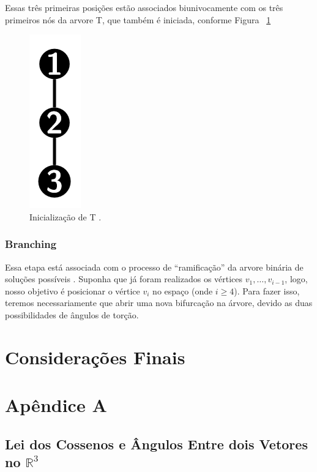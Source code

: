 \documentclass[a4paper,12pt]{article}
\begin{document}
	Essas três primeiras posições estão associados biunivocamente com os três primeiros nós da arvore T, que também é iniciada, conforme Figura ~\ref{fig:bp1}
	
	\begin{figure}[H]
		\begin{center}
			\includegraphics[width=0.035\linewidth]{bp1.png}
		\end{center}
		\caption{Inicialização de T \cite{fidalgotese}.}
		\label{fig:bp1}
	\end{figure}
		
	\subsubsection*{Branching}
	Essa etapa está associada com o processo de ``ramificação'' da arvore binária de soluções possíveis \cite{fidalgotese}. Suponha que já foram realizados os vértices $v_1, \dots, v_{i-1}$, logo, nosso objetivo é posicionar o vértice $v_i$ no espaço (onde $i\geq4$). Para fazer isso, teremos necessariamente que abrir uma nova bifurcação na árvore, devido as duas possibilidades de ângulos de torção.
	
	
	\newpage
	\section{Considerações Finais}
	
	\newpage
	
	
	
	
	
	\newpage
	
	\section*{Apêndice A}
	\subsection*{Lei dos Cossenos e Ângulos Entre dois Vetores no $\mathbb{R}^3$}
	
\end{document}
